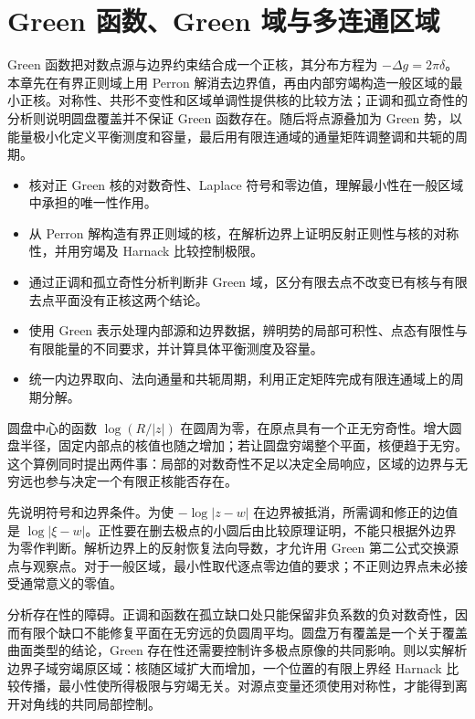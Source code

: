 \chapter{Green 函数、Green 域与多连通区域}
\label{b3:ch:17}
\begin{chapterabstract}
Green 函数把对数点源与边界约束结合成一个正核，其分布方程为 \(-\Delta g=2\pi\delta\)。本章先在有界正则域上用 Perron 解消去边界值，再由内部穷竭构造一般区域的最小正核。对称性、共形不变性和区域单调性提供核的比较方法；正调和孤立奇性的分析则说明圆盘覆盖并不保证 Green 函数存在。随后将点源叠加为 Green 势，以能量极小化定义平衡测度和容量，最后用有限连通域的通量矩阵调整调和共轭的周期。
\end{chapterabstract}

\begin{learninggoals}
\begin{itemize}
\item 核对正 Green 核的对数奇性、Laplace 符号和零边值，理解最小性在一般区域中承担的唯一性作用。
\item 从 Perron 解构造有界正则域的核，在解析边界上证明反射正则性与核的对称性，并用穷竭及 Harnack 比较控制极限。
\item 通过正调和孤立奇性分析判断非 Green 域，区分有限去点不改变已有核与有限去点平面没有正核这两个结论。
\item 使用 Green 表示处理内部源和边界数据，辨明势的局部可积性、点态有限性与有限能量的不同要求，并计算具体平衡测度及容量。
\item 统一内边界取向、法向通量和共轭周期，利用正定矩阵完成有限连通域上的周期分解。
\end{itemize}
\end{learninggoals}

圆盘中心的函数 \(\log(R/|z|)\) 在圆周为零，在原点具有一个正无穷奇性。增大圆盘半径，固定内部点的核值也随之增加；若让圆盘穷竭整个平面，核便趋于无穷。这个算例同时提出两件事：局部的对数奇性不足以决定全局响应，区域的边界与无穷远也参与决定一个有限正核能否存在。

\ProseParagraphBreak
{}先说明符号和边界条件。为使 \(-\log|z-w|\) 在边界被抵消，所需调和修正的边值是 \(\log|\xi-w|\)。正性要在删去极点的小圆后由比较原理证明，不能只根据外边界为零作判断。解析边界上的反射恢复法向导数，才允许用 Green 第二公式交换源点与观察点。对于一般区域，最小性取代逐点零边值的要求；不正则边界点未必接受通常意义的零值。

\ProseParagraphBreak
{}分析存在性的障碍。正调和函数在孤立缺口处只能保留非负系数的负对数奇性，因而有限个缺口不能修复平面在无穷远的负圆周平均。圆盘万有覆盖是一个关于覆盖曲面类型的结论，Green 存在性还需要控制许多极点原像的共同影响。则以实解析边界子域穷竭原区域：核随区域扩大而增加，一个位置的有限上界经 Harnack 比较传播，最小性使所得极限与穷竭无关。对源点变量还须使用对称性，才能得到离开对角线的共同局部控制。

